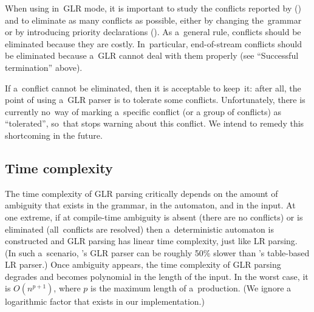 When using \menhir in~GLR mode,
it is important
to study the conflicts reported by \menhir
()
and to eliminate as many conflicts as possible,
either by changing the~grammar
or by introducing priority declarations ().
%
As a~general rule,
conflicts should be eliminated because they are costly.
%
In~particular,
end-of-stream conflicts should be eliminated
because a~GLR cannot deal with them properly
(see ``Successful termination'' above).

If a~conflict cannot be eliminated,
then it is acceptable to keep~it:
after all,
the point of using a~GLR parser is to tolerate some conflicts.
%
Unfortunately,
there is currently no~way of marking a~specific conflict
(or a group of conflicts) as ``tolerated'',
so~that \menhir stops warning about this conflict.
%
We intend to remedy this shortcoming in the future.


\subsection{Time complexity}
\label{sec:GLR:complexity}

The time complexity of GLR parsing critically depends on the amount of
ambiguity that exists in the grammar, in the automaton, and in the input.
%
At one extreme, if at compile-time ambiguity is absent
(there are no conflicts)
or is eliminated
(all~conflicts are resolved)
then
a~deterministic automaton is constructed
and
GLR parsing has linear time complexity,
just like LR parsing.
%
(In such a~scenario, \menhir's GLR parser can be roughly 50\% slower than
\menhir's table-based LR parser.)
%
Once ambiguity appears,
the time complexity of GLR parsing degrades
and becomes polynomial in the length of the input.
%
In the worst case,
it is $O(n^{p+1})$,
where $p$ is the maximum length of a~production.
%
(We ignore a logarithmic factor that exists in our implementation.)

